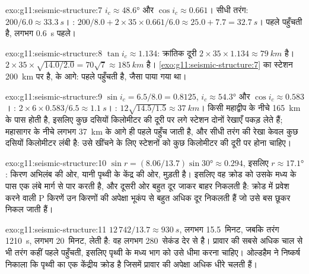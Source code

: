 \begin{solution}{exo:g11:seismic-structure:7}
$i_c \approx \ang{48.6}$ और $\cos i_c \approx 0.661$। सीधी तरंग: $200/6.0
\approx \qty{33.3}{s}$। : $200/8.0 + 2 \times 35 \times 0.661/6.0
\approx 25.0 + 7.7 = \qty{32.7}{s}$।  पहले पहुँचती है, लगभग
\qty{0.6}{s} पहले।
\end{solution}

\begin{solution}{exo:g11:seismic-structure:8}
$\tan i_c \approx 1.134$: क्रांतिक दूरी $2 \times 35 \times 1.134
\approx \qty{79}{km}$ है।  $2 \times 35 \times
\sqrt{14.0/2.0} = 70\sqrt 7 \approx \qty{185}{km}$ है।
\cref{exo:g11:seismic-structure:7} का स्टेशन \qty{200}{km} पर है,  के
आगे:  पहले पहुँचती है, जैसा पाया गया था।
\end{solution}

\begin{solution}{exo:g11:seismic-structure:9}
$\sin i_c = 6.5/8.0 = 0.8125$, $i_c \approx \ang{54.3}$ और $\cos i_c \approx
0.583$। : $2 \times 6 \times 0.583/6.5 \approx \qty{1.1}{s}$।
: $12\sqrt{14.5/1.5} \approx \qty{37}{km}$। किसी
महाद्वीप के नीचे  \qty{165}{km} के पास होती है, इसलिए कुछ दसियों
किलोमीटर की दूरी पर लगे स्टेशन दोनों रेखाएँ पकड़ लेते हैं; महासागर के नीचे  लगभग
\qty{37}{km} के आगे ही पहले पहुँच जाती है, और सीधी तरंग की रेखा केवल
कुछ दसियों किलोमीटर लंबी है: उसे खींचने के लिए स्टेशनों को कुछ किलोमीटर की
दूरी पर होना चाहिए।
\end{solution}

\begin{solution}{exo:g11:seismic-structure:10}
$\sin r = (8.06/13.7)\sin\ang{30} \approx 0.294$, इसलिए $r \approx \ang{17.1}$:
किरण अभिलंब की ओर, यानी पृथ्वी के केंद्र की ओर, मुड़ती है।
इसलिए वह क्रोड को उसके मध्य के पास एक लंबे मार्ग से पार करती है,
और दूसरी ओर बहुत दूर जाकर बाहर निकलती है: क्रोड में प्रवेश करने वाली P किरणें
उन किरणों की अपेक्षा भूकंप से बहुत अधिक दूर निकलती हैं जो उसे बस छूकर निकल जाती हैं।
\end{solution}

\begin{solution}{exo:g11:seismic-structure:11}
$12\,742/13.7 \approx \qty{930}{s}$, लगभग 15.5~मिनट, जबकि तरंग
\qty{1210}{s}, लगभग 20~मिनट, लेती है: वह लगभग 280~सेकंड देर से है। प्रावार की
सबसे अधिक चाल से भी तरंग कहीं पहले पहुँचती, इसलिए
पृथ्वी के मध्य भाग को उसे धीमा करना चाहिए। ओल्डहैम ने निष्कर्ष निकाला कि पृथ्वी का
एक केंद्रीय क्रोड है जिसमें  प्रावार की अपेक्षा अधिक धीरे चलती हैं।
\end{solution}

